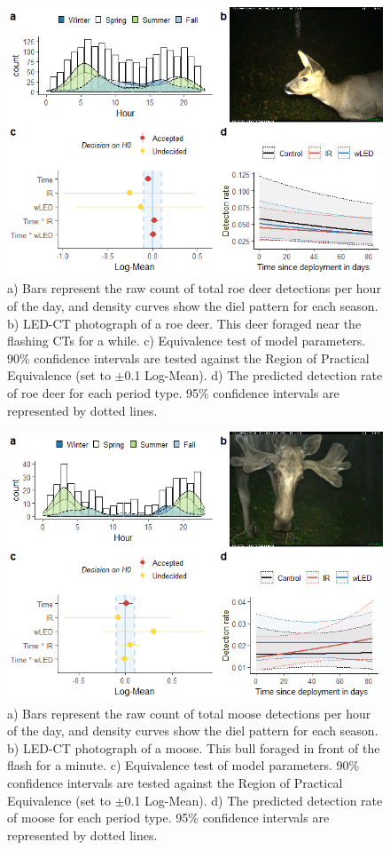 \begin{figure}[b]
\centering
	\includegraphics[width=12cm]{../R/glmm_sp_files/figure-html/parameters-1.png}
\caption[Roe deer]
{\scriptsize %
a) Bars represent the raw count of total roe deer detections per hour of the day, and density curves show the diel pattern for each season.
b) LED-CT photograph of a roe deer. This deer foraged near the flashing CTs for a while.
c) Equivalence test of model parameters. 90\% confidence intervals are tested against the Region of Practical Equivalence (set to $\pm$0.1 Log-Mean).
d) The predicted detection rate of roe deer for each period type. 95\% confidence intervals are represented by dotted lines.}
\label{raadyr}
\end{figure}

\begin{figure}
		  \centering
	\includegraphics[width=12cm]{../R/glmm_sp_files/figure-html/elg2-1.png}
\caption[Moose]
{\scriptsize
	a) Bars represent the raw count of total moose detections per hour of the day, and density curves show the diel pattern for each season.
	b) LED-CT photograph of a moose. This bull foraged in front of the flash for a minute.
	c) Equivalence test of model parameters. 90\% confidence intervals are tested against the Region of Practical Equivalence (set to $\pm$0.1 Log-Mean).
	d) The predicted detection rate of moose for each period type. 95\% confidence intervals are represented by dotted lines.}
\label{elg}
\end{figure}

